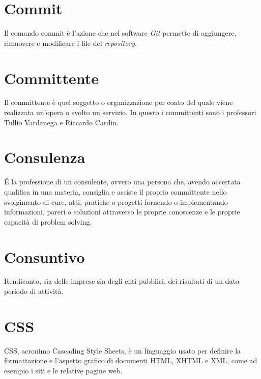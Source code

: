 \section{Commit}\label{sec:Commits}
Il comando commit è l'azione che nel software \emph{Git} permette di aggiungere, rimuovere e modificare i file del \emph{repository}.

\section{Committente}\label{sec:Committenti}
Il committente è quel soggetto o organizzazione per conto del quale viene realizzata un'opera o svolto un servizio. In questo  i committenti sono i professori Tullio Vardanega e Riccardo Cardin.

\section{Consulenza}\label{sec:Consulenze}
É la professione di un consulente, ovvero una persona che, avendo accertata qualifica in una materia, consiglia e assiste il proprio committente nello svolgimento di cure, atti, pratiche o progetti fornendo o implementando informazioni, pareri o soluzioni attraverso le proprie conoscenze e le proprie capacità di problem solving.

\section{Consuntivo}\label{sec:Consuntivi}
Rendiconto, sia delle imprese sia degli enti pubblici, dei risultati di un dato periodo di attività.

\section{CSS}\label{sec:Cascading Style Sheets}
CSS, acronimo Cascading Style Sheets, è un linguaggio usato per definire la formattazione e l'aspetto grafico di documenti HTML, XHTML e XML, come ad esempio i siti e le relative pagine web.